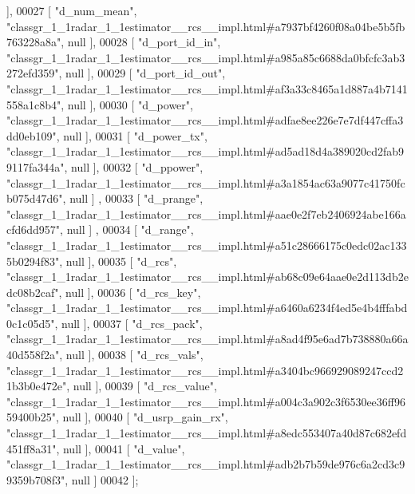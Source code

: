 \begin{DoxyCode}
       ],
00027     [ \textcolor{stringliteral}{"d\_num\_mean"}, \textcolor{stringliteral}{"classgr\_1\_1radar\_1\_1estimator\_\_rcs\_\_impl.html#a7937bf4260f08a04be5b5fb763228a8a"}, null
       ],
00028     [ \textcolor{stringliteral}{"d\_port\_id\_in"}, \textcolor{stringliteral}{"classgr\_1\_1radar\_1\_1estimator\_\_rcs\_\_impl.html#a985a85c6688da0bfcfc3ab3272efd359"}, 
      null ],
00029     [ \textcolor{stringliteral}{"d\_port\_id\_out"}, \textcolor{stringliteral}{"classgr\_1\_1radar\_1\_1estimator\_\_rcs\_\_impl.html#af3a33c8465a1d887a4b7141558a1c8b4"}, 
      null ],
00030     [ \textcolor{stringliteral}{"d\_power"}, \textcolor{stringliteral}{"classgr\_1\_1radar\_1\_1estimator\_\_rcs\_\_impl.html#adfae8ee226e7e7df447cffa3dd0eb109"}, null ],
00031     [ \textcolor{stringliteral}{"d\_power\_tx"}, \textcolor{stringliteral}{"classgr\_1\_1radar\_1\_1estimator\_\_rcs\_\_impl.html#ad5ad18d4a389020cd2fab99117fa344a"}, null
       ],
00032     [ \textcolor{stringliteral}{"d\_ppower"}, \textcolor{stringliteral}{"classgr\_1\_1radar\_1\_1estimator\_\_rcs\_\_impl.html#a3a1854ac63a9077c41750fcb075d47d6"}, null ]
      ,
00033     [ \textcolor{stringliteral}{"d\_prange"}, \textcolor{stringliteral}{"classgr\_1\_1radar\_1\_1estimator\_\_rcs\_\_impl.html#aae0e2f7eb2406924abe166acfd6dd957"}, null ]
      ,
00034     [ \textcolor{stringliteral}{"d\_range"}, \textcolor{stringliteral}{"classgr\_1\_1radar\_1\_1estimator\_\_rcs\_\_impl.html#a51c28666175c0edc02ac1335b0294f83"}, null ],
00035     [ \textcolor{stringliteral}{"d\_rcs"}, \textcolor{stringliteral}{"classgr\_1\_1radar\_1\_1estimator\_\_rcs\_\_impl.html#ab68c09e64aae0e2d113db2edc08b2caf"}, null ],
00036     [ \textcolor{stringliteral}{"d\_rcs\_key"}, \textcolor{stringliteral}{"classgr\_1\_1radar\_1\_1estimator\_\_rcs\_\_impl.html#a6460a6234f4ed5e4b4fffabd0c1c05d5"}, null 
      ],
00037     [ \textcolor{stringliteral}{"d\_rcs\_pack"}, \textcolor{stringliteral}{"classgr\_1\_1radar\_1\_1estimator\_\_rcs\_\_impl.html#a8ad4f95e6ad7b738880a66a40d558f2a"}, null
       ],
00038     [ \textcolor{stringliteral}{"d\_rcs\_vals"}, \textcolor{stringliteral}{"classgr\_1\_1radar\_1\_1estimator\_\_rcs\_\_impl.html#a3404bc966929089247ccd21b3b0e472e"}, null
       ],
00039     [ \textcolor{stringliteral}{"d\_rcs\_value"}, \textcolor{stringliteral}{"classgr\_1\_1radar\_1\_1estimator\_\_rcs\_\_impl.html#a004c3a902c3f6530ee36ff9659400b25"}, 
      null ],
00040     [ \textcolor{stringliteral}{"d\_usrp\_gain\_rx"}, \textcolor{stringliteral}{"classgr\_1\_1radar\_1\_1estimator\_\_rcs\_\_impl.html#a8edc553407a40d87c682efd451ff8a31"}, 
      null ],
00041     [ \textcolor{stringliteral}{"d\_value"}, \textcolor{stringliteral}{"classgr\_1\_1radar\_1\_1estimator\_\_rcs\_\_impl.html#adb2b7b59de976c6a2cd3c99359b708f3"}, null ]
00042 ];
\end{DoxyCode}
